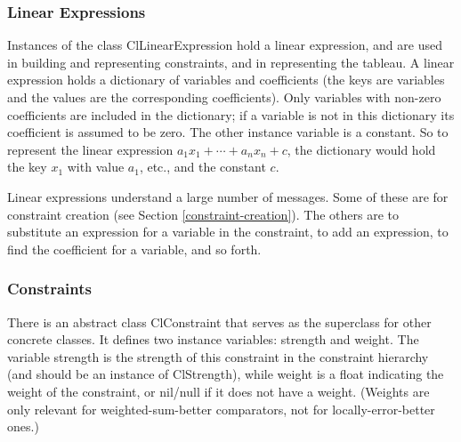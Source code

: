 \documentclass{article}
\begin{document}
\subsubsection{Linear Expressions}

Instances of the class {\sf ClLinearExpression} hold a linear expression,
and are used in building and representing
constraints, and in representing the tableau.  A linear expression holds a
dictionary of variables and coefficients (the keys are variables and the
values are the corresponding coefficients).  Only variables
with non-zero coefficients are included in the dictionary; 
if a variable is not in this
dictionary its coefficient is assumed to be zero.  The other instance
variable is a constant.  So to represent the linear expression 
$a_1 x_1 + \cdots + a_n x_n + c$, the dictionary would hold the key $x_1$
with value $a_1$, etc., and the constant $c$.  


Linear expressions understand  a large number of messages.  Some of these
are for constraint creation (see Section \ref{constraint-creation}).  The
others are to substitute an expression for a variable in the constraint, to
add an expression, to find the coefficient for a variable, and so forth.

\subsubsection{Constraints}
\label{constraint-classes}

There is an abstract class {\sf ClConstraint} that serves as the superclass
for other concrete classes.  It defines two instance variables: {\sf
strength} and {\sf weight}.  The variable {\sf strength} is the strength of
this constraint in the constraint hierarchy (and should be an instance of
{\sf ClStrength}), while {\sf weight} is a float indicating the weight of
the constraint, or {\sf nil}/{\sf null} if it does not have a weight.  (Weights are only
relevant for  weighted-sum-better comparators, not for
locally-error-better ones.) 
\end{document}
